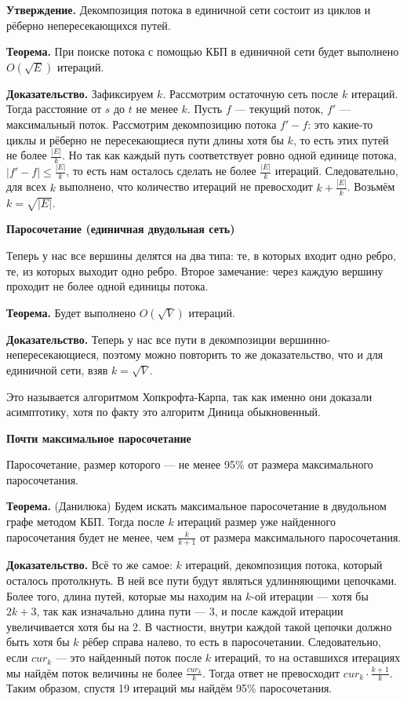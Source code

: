 \textbf{Утверждение.} Декомпозиция потока в единичной сети состоит из циклов и рёберно непересекающихся путей.

\textbf{Теорема.} При поиске потока с помощью КБП в единичной сети будет выполнено $O(\sqrt E)$ итераций.

\textbf{Доказательство.} Зафиксируем $k$. Рассмотрим остаточную сеть после $k$ итераций.
Тогда расстояние от $s$ до $t$ не менее $k$.
Пусть $f$ --- текущий поток, $f'$ --- максимальный поток.
Рассмотрим декомпозицию потока $f' - f$: это какие-то циклы и рёберно не пересекающиеся пути длины хотя бы $k$, то есть этих путей не более $\frac{|E|}{k}$.
Но так как каждый путь соответствует ровно одной единице потока, $|f' - f| \le \frac{|E|}{k}$, то есть нам осталось сделать не более $\frac{|E|}{k}$ итераций.
Следовательно, для всех $k$ выполнено, что количество итераций не превосходит $k + \frac{|E|}{k}$.
Возьмём $k = \sqrt{|E|}$.

\textbf{Паросочетание (единичная двудольная сеть)}

Теперь у нас все вершины делятся на два типа: те, в которых входит одно ребро, те, из которых выходит одно ребро.
Второе замечание: через каждую вершину проходит не более одной единицы потока.

\textbf{Теорема.} Будет выполнено $O(\sqrt V)$ итераций.

\textbf{Доказательство.} Теперь у нас все пути в декомпозиции вершинно-непересекающиеся, поэтому можно повторить то же доказательство, что и для единичной сети, взяв $k = \sqrt V$.

Это называется алгоритмом Хопкрофта-Карпа, так как именно они доказали асимптотику, хотя по факту это алгоритм Диница обыкновенный.

\textbf{Почти максимальное паросочетание}

Паросочетание, размер которого --- не менее 95\% от размера максимального паросочетания.

\textbf{Теорема.} (Данилюка) Будем искать максимальное паросочетание в двудольном графе методом КБП. 
Тогда после $k$ итераций размер уже найденного паросочетания будет не менее, чем $\frac{k}{k+1}$ от размера максимального паросочетания.

\textbf{Доказательство.} Всё то же самое: $k$ итераций, декомпозиция потока, который осталось протолкнуть.
В ней все пути будут являться удлинняющими цепочками. 
Более того, длина путей, которые мы находим на $k$-ой итерации --- хотя бы $2k + 3$, так как изначально длина пути --- 3, и после каждой итерации увеличивается хотя бы на 2.
В частности, внутри каждой такой цепочки должно быть хотя бы $k$ рёбер справа налево, то есть в паросочетании.
Следовательно, если $cur_k$ --- это найденный поток после $k$ итераций, то на оставшихся итерациях мы найдём поток величины не более $\frac{cur_k}{k}$.
Тогда ответ не превосходит $cur_k \cdot \frac{k + 1}{k}$.
Таким образом, спустя 19 итераций мы найдём 95\% паросочетания.

